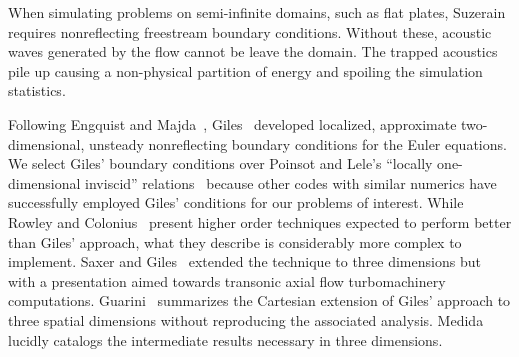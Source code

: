 \documentclass[letterpaper,11pt,nointlimits,reqno,draft]{amsart}
\begin{document}
When simulating problems on semi-infinite domains, such as flat plates,
Suzerain requires nonreflecting freestream boundary conditions.  Without these,
acoustic waves generated by the flow cannot be leave the domain.   The trapped
acoustics pile up causing a non-physical partition of energy and spoiling the
simulation statistics.

Following Engquist and Majda~\cite{Engquist1977Absorbing},
Giles~\cite{Giles1988Nonreflecting,Giles1990Nonreflecting} developed localized,
approximate two-dimensional, unsteady nonreflecting boundary conditions for the
Euler equations.  We select Giles' boundary conditions over Poinsot and Lele's
``locally one-dimensional inviscid'' relations~\cite{Poinsot1992Boundary}
because other codes with similar numerics have successfully employed Giles'
conditions for our problems of interest.  While Rowley and
Colonius~\cite{Rowley2000Discretely} present higher order techniques expected
to perform better than Giles' approach, what they describe is considerably more
complex to implement.  Saxer and Giles~\cite{Saxer1993QuasiThreeDimensional}
extended the technique to three dimensions but with a presentation aimed
towards transonic axial flow turbomachinery computations.
Guarini~\cite{Guarini1998} summarizes the Cartesian extension of Giles'
approach to three spatial dimensions without reproducing the associated
analysis.  Medida~\cite{Medida2007} lucidly catalogs the intermediate results
necessary in three dimensions.
\end{document}
